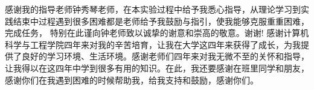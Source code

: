 感谢我的指导老师钟秀琴老师，在本实验过程中给予我悉心指导，从理论学习到实践结束中过程遇到很多困难都是老师给予我鼓励与指引，使我能够克服重重困难，完成任务， 特别在此谨向钟老师致以诚挚的谢意和崇高的敬意。谢谢!
感谢计算机科学与工程学院四年来对我的辛苦培育，让我在大学这四年来获得了成长，为我提供了良好的学习环境、生活环境。感谢老师们四年来对我无微不至的关怀和指导，让我得以在这四年中学到很多有用的知识。在此，我还要感谢在班里同学和朋友，感谢你们在我遇到困难的时候帮助我，给我支持和鼓励，感谢你们。
